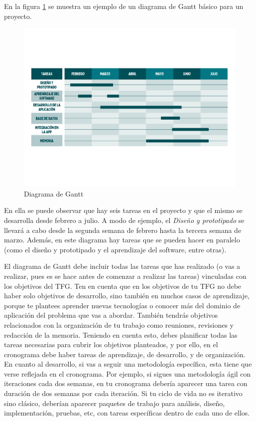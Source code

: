 En la figura \ref{fig:gantt} se muestra un ejemplo de un diagrama de Gantt básico para un proyecto.

\begin{figure}[!t]
    \centering
    \includegraphics[width=1.0\textwidth]{images/EjemploGantt.pdf}
    \caption{Diagrama de Gantt\label{fig:gantt}}
\end{figure}

En ella se puede observar que hay seis tareas en el proyecto y que el mismo se desarrolla desde febrero a julio. A modo de ejemplo, el \textit{Diseño y prototipado} se llevará a cabo desde la segunda semana de febrero hasta la tercera semana de marzo. Además, en este diagrama hay tareas que se pueden hacer en paralelo (como el diseño y prototipado y el aprendizaje del software, entre otras). %

El diagrama de Gantt debe incluir todas las tareas que has realizado (o vas a realizar, pues es se hace antes de comenzar a realizar las tareas) vinculadas con los objetivos del TFG. Ten en cuenta que en los objetivos de tu TFG no debe haber solo objetivos de desarrollo, sino también en muchos casos de aprendizaje, porque te plantees aprender nuevas tecnologías o conocer más del dominio de aplicación del problema que vas a abordar. También tendrás objetivos relacionados con la organización de tu trabajo como reuniones, revisiones y redacción de la memoria. Teniendo en cuenta esto, debes planificar todas las tareas necesarias para cubrir los objetivos planteados, y por ello, en el cronograma debe haber tareas de aprendizaje, de desarrollo, y de organización. En cuanto al desarrollo, si vas a seguir una metodología específica, esta tiene que verse reflejada en el cronograma. Por ejemplo, si sigues una metodología ágil con iteraciones cada dos semanas, en tu cronograma debería aparecer una tarea con duración de dos semanas por cada iteración. Si tu ciclo de vida no es iterativo sino clásico, deberían aparecer paquetes de trabajo para análisis, diseño, implementación, pruebas, etc, con tareas específicas dentro de cada uno de ellos.

